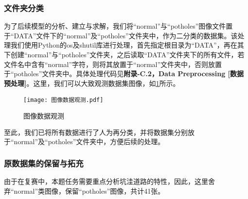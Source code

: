\documentclass{MathorCupmodeling}
\begin{document}
\begin{table}[H]
	\centering
	\caption{异常标注图片的处理}
	\label{tab:异常图片处理}
\end{table}

  
	\subsubsection{文件夹分类}
	为了后续模型的分析、建立与求解，我们将“normal”与“potholes”图像文件置于“DATA”文件下的“normal”及“potholes”文件夹中，作为二分类的数据集。该处理我们使用Python的os及shutil库进行处理，首先指定根目录为“DATA”，再在其下创建“normal”与“potholes”文件夹，之后读取“DATA”文件夹下的所有文件，若文件名中含有“normal”字符，则将其放置于“normal”文件夹中，否则放置于“potholes”文件夹中。具体处理代码见\textbf{附录-C.2，Data Preprocessing [数据预处理]}。这里，我们可以大致观测数据集图像，如\textcolor{blue}{\cref{fig:图像数据观测}}所示。
	\begin{figure}[H]
		\centering
		\texttt{[image: 图像数据观测.pdf]}
		\caption{图像数据观测}
		\label{fig:图像数据观测}
	\end{figure}
	至此，我们已将所有数据进行了人为再分类，并将数据集分别放于“normal”及“potholes”文件夹中，方便后续的处理。
	
	\subsubsection{原数据集的保留与拓充}
	由于在复赛中，本题任务需要重点分析坑洼道路的特性，因此，这里舍弃“normal”类图像，保留“potholes”图像，共计41张。
\end{document}
